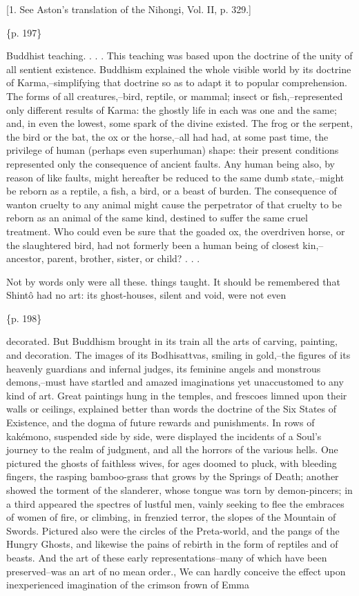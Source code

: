 [1. See Aston's translation of the Nihongi, Vol. II, p. 329.]

\{p. 197\}

Buddhist teaching. . . . This teaching was based upon the doctrine of the unity of all sentient existence. Buddhism explained the whole visible world by its doctrine of Karma,--simplifying that doctrine so as to adapt it to popular comprehension. The forms of all creatures,--bird, reptile, or mammal; insect or fish,--represented only different results of Karma: the ghostly life in each was one and the same; and, in even the lowest, some spark of the divine existed. The frog or the serpent, the bird or the bat, the ox or the horse,--all had had, at some past time, the privilege of human (perhaps even superhuman) shape: their present conditions represented only the consequence of ancient faults. Any human being also, by reason of like faults, might hereafter be reduced to the same dumb state,--might be reborn as a reptile, a fish, a bird, or a beast of burden. The consequence of wanton cruelty to any animal might cause the perpetrator of that cruelty to be reborn as an animal of the same kind, destined to suffer the same cruel treatment. Who could even be sure that the goaded ox, the overdriven horse, or the slaughtered bird, had not formerly been a human being of closest kin,--ancestor, parent, brother, sister, or child? . . .



Not by words only were all these. things taught. It should be remembered that Shintô had no art: its ghost-houses, silent and void, were not even

\{p. 198\}

decorated. But Buddhism brought in its train all the arts of carving, painting, and decoration. The images of its Bodhisattvas, smiling in gold,--the figures of its heavenly guardians and infernal judges, its feminine angels and monstrous demons,--must have startled and amazed imaginations yet unaccustomed to any kind of art. Great paintings hung in the temples, and frescoes limned upon their walls or ceilings, explained better than words the doctrine of the Six States of Existence, and the dogma of future rewards and punishments. In rows of kakémono, suspended side by side, were displayed the incidents of a Soul's journey to the realm of judgment, and all the horrors of the various hells. One pictured the ghosts of faithless wives, for ages doomed to pluck, with bleeding fingers, the rasping bamboo-grass that grows by the Springs of Death; another showed the torment of the slanderer, whose tongue was torn by demon-pincers; in a third appeared the spectres of lustful men, vainly seeking to flee the embraces of women of fire, or climbing, in frenzied terror, the slopes of the Mountain of Swords. Pictured also were the circles of the Preta-world, and the pangs of the Hungry Ghosts, and likewise the pains of rebirth in the form of reptiles and of beasts. And the art of these early representations--many of which have been preserved--was an art of no mean order., We can hardly conceive the effect upon inexperienced imagination of the crimson frown of Emma

